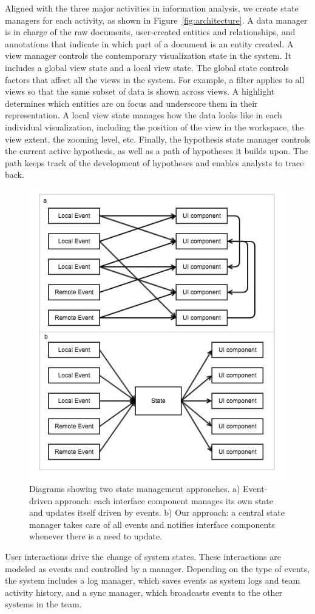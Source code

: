 Aligned with the three major activities in information analysis, we create state managers for each activity, as shown in Figure~\ref{fig:architecture}. A data manager is in charge of the raw documents, user-created entities and relationships, and annotations that indicate in which part of a document is an entity created. A view manager controls the contemporary visualization state in the system. It includes a global view state and a local view state. The global state controls factors that affect all the views in the system. For example, a filter applies to all views so that the same subset of data is shown across views. A highlight determines which entities are on focus and underscore them in their representation. A local view state manages how the data looks like in each individual visualization, including the position of the view in the workspace, the view extent, the zooming level, etc. 
Finally, the hypothesis state manager controls the current active hypothesis, as well as a path of hypotheses it builds upon. The path keeps track of the development of hypotheses and enables analysts to trace back. 


\begin{figure}
	\centering
	\includegraphics[width=.4\linewidth]{03-System/img/state_management.jpg}
	\caption{Diagrams showing two state management approaches. a) Event-driven approach: each interface component manages its own state and updates itself driven by events. b) Our approach: a central state manager takes care of all events and notifies interface components whenever there is a need to update.\label{fig:state_management}}
\end{figure}

User interactions drive the change of system states. These interactions are modeled as events and controlled by a manager. Depending on the type of events, the system includes a log manager, which saves events as system logs and team activity history, and a sync manager, which broadcasts events to the other systems in the team. 

